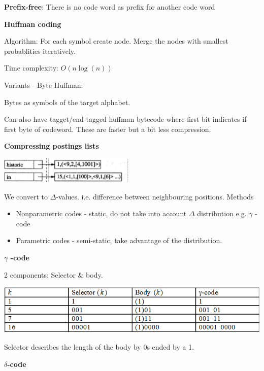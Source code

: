 \documentclass[a4paper,10pt,landscape]{article}
\begin{document}
\begin{multicols}{3}
\textbf{Prefix-free}: There is no code word as prefix for another code word

\textbf{Huffman coding}

Algorithm:
For each symbol create node. Merge the nodes with smallest probablities iteratively.

Time complexity: $O(n\log(n))$

Variants - Byte Huffman:

Bytes as symbols of the target alphabet.

Can also have tagget/end-tagged huffman bytecode where first bit indicates if first byte of codeword. These are faster but a bit less compression.

\textbf{Compressing postings lists}

\includegraphics[width=.5\linewidth]{images/invertedfile}

We convert to $\Delta$-values. i.e. difference between neighbouring positions.
Methods
\begin{itemize}
\item Nonparametric codes - static, do not take into account $\Delta$ distribution e.g. $\gamma$ -code
\item Parametric codes - semi-static, take advantage of the distribution.
\end{itemize}


\textbf{$\gamma$ -code}

2 components: Selector \& body.

\includegraphics[width=.75\linewidth]{images/gammacode.png}

Selector describes the length of the body by 0s ended by a 1.

\textbf{$\delta$-code}

\end{multicols}
\end{document}
